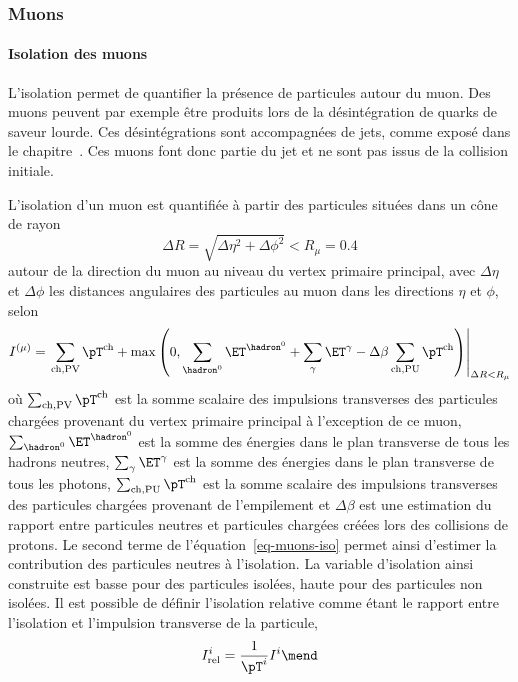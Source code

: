 \subsubsection{Muons}
\paragraph{Isolation des muons}
L'isolation permet de quantifier la présence de particules autour du muon.
Des muons peuvent par exemple être produits lors de la désintégration de quarks de saveur lourde.
Ces désintégrations sont accompagnées de jets, comme exposé dans le chapitre~.
Ces muons font donc partie du jet et ne sont pas issus de la collision initiale.
\par
L'isolation d'un muon est quantifiée à partir des particules situées dans un cône de rayon
\begin{equation}
\Delta R = \sqrt{\Delta\eta^2+\Delta\phi^2} < R_\mu=\num{0.4}
\end{equation}
autour de la direction du muon au niveau du vertex primaire principal,
avec $\Delta\eta$ et $\Delta\phi$ les distances angulaires des particules au muon dans les directions $\eta$ et $\phi$,
selon
\begin{equation}
I^{(\mu)}
=
\left.
\sum_{\text{ch},\text{PV}} \pT^{\text{ch}}
+
\max\left(
0
,
\sum_{\hadron^0}\ET^{\hadron^0}
+
\sum_{\gamma}\ET^{\gamma}
- \Delta\beta
\sum_{\text{ch},\text{PU}} \pT^{\text{ch}}
\right)
\right|_{\Delta R < R_\mu}
\label{eq-muons-iso}
\end{equation}
où
$\sum_{\text{ch},\text{PV}} \pT^{\text{ch}}$ est la somme scalaire des impulsions transverses des particules chargées provenant du vertex primaire principal à l'exception de ce muon,
$\sum_{\hadron^0}\ET^{\hadron^0}$ est la somme des énergies dans le plan transverse de tous les hadrons neutres,
$\sum_{\gamma}\ET^{\gamma}$ est la somme des énergies dans le plan transverse de tous les photons,
$\sum_{\text{ch},\text{PU}} \pT^{\text{ch}}$ est la somme scalaire des impulsions transverses des particules chargées provenant de l'empilement et
$\Delta\beta$ est une estimation du rapport entre particules neutres et particules chargées créées lors des collisions de protons.
Le second terme de l'équation~\eqref{eq-muons-iso} permet ainsi d'estimer la contribution des particules neutres à l'isolation.
La variable d'isolation ainsi construite est basse pour des particules isolées, haute pour des particules non isolées.
Il est possible de définir l'isolation relative comme étant le rapport entre l'isolation et l'impulsion transverse de la particule,
\begin{equation}
I_\text{rel}^{i}
=
\frac{1}{\pT^{i}}
I^{i}
\mend
\label{eq-muons-reliso}
\end{equation}
